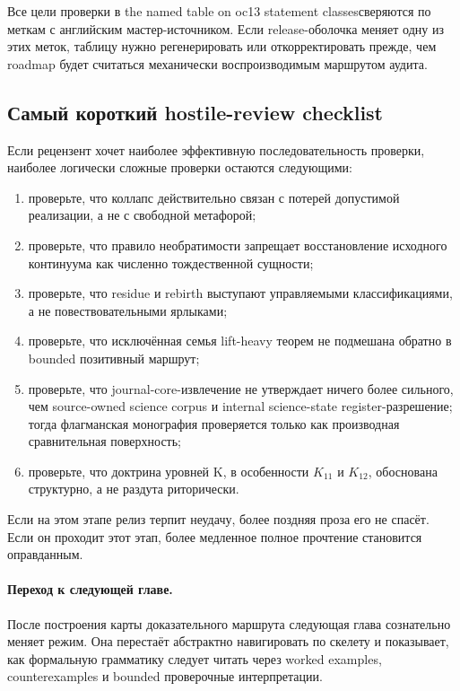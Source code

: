 Все цели проверки в the named table on oc13 statement classesсверяются по меткам с английским мастер-источником. Если release-оболочка меняет одну из этих меток, таблицу нужно регенерировать или откорректировать прежде, чем roadmap будет считаться механически воспроизводимым маршрутом аудита.

\subsection{Самый короткий hostile-review checklist}

Если рецензент хочет наиболее эффективную последовательность проверки, наиболее логически сложные проверки остаются следующими:

\begin{enumerate}
\item проверьте, что коллапс действительно связан с потерей допустимой реализации, а не с свободной метафорой;
\item проверьте, что правило необратимости запрещает восстановление исходного континуума как численно тождественной сущности;
\item проверьте, что residue и rebirth выступают управляемыми классификациями, а не повествовательными ярлыками;
\item проверьте, что исключённая семья lift-heavy теорем не подмешана обратно в bounded позитивный маршрут;
\item проверьте, что journal-core-извлечение не утверждает ничего более сильного, чем source-owned science corpus и internal science-state register-разрешение; тогда флагманская монография проверяется только как производная сравнительная поверхность;
\item проверьте, что доктрина уровней K, в особенности \(K_{11}\) и \(K_{12}\), обоснована структурно, а не раздута риторически.
\end{enumerate}

Если на этом этапе релиз терпит неудачу, более поздняя проза его не спасёт. Если он проходит этот этап, более медленное полное прочтение становится оправданным.

\paragraph{Переход к следующей главе.}
После построения карты доказательного маршрута следующая глава сознательно меняет режим. Она перестаёт абстрактно навигировать по скелету и показывает, как формальную грамматику следует читать через worked examples, counterexamples и bounded проверочные интерпретации.

\clearpage

